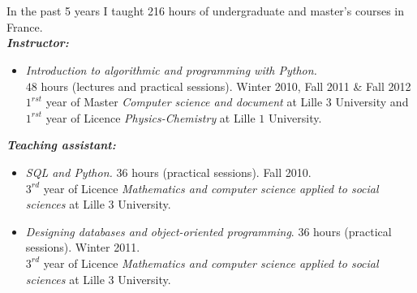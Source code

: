 \noindent{}\\[-.4cm]\noindent\makebox[\linewidth]{\rule{\columnwidth}{0.4pt}}\\[.1cm]
In the past 5 years I taught 216 hours of undergraduate and master's courses in France.\\
\textit{\textbf{Instructor:}} 
 \begin{itemize} 
 \item\textit{Introduction to algorithmic and programming with Python.}\\
    $48$ hours (lectures and practical sessions). Winter 2010, Fall 2011 \& Fall 2012\\
    $1^{rst}$ year of Master \textit{Computer science and document} at Lille $3$ University and  $1^{rst}$ year of Licence \textit{Physics-Chemistry} at Lille $1$ University.
    \end{itemize}
\textit{\textbf{Teaching assistant:}} 
\begin{itemize}
 \item \textit{SQL and Python.} $36$ hours (practical sessions). Fall 2010.\\
    $3^{rd}$ year of Licence \textit{Mathematics and computer science applied to social sciences} at Lille 3 University. 
\item \textit{Designing databases and object-oriented programming}.
    $36$ hours (practical sessions). Winter 2011.\\
    $3^{rd}$ year of Licence \textit{Mathematics and computer science applied to social sciences} at Lille 3 University. 
\end{itemize}

